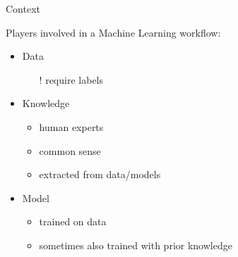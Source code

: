 \documentclass[presentation]{beamer}\mode<presentation>{\usetheme{blackAMSBolognaFC}}
\begin{document}
\begin{frame}[c]{Context}

    Players involved in a Machine Learning workflow:
    \vspace{0.5cm}
    \begin{itemize}
        \item Data
        \begin{itemize}
            \item[!] require \alert{labels}
        \end{itemize}

        \vfill

        \item Knowledge
        \begin{itemize}
            \item human experts
            \item common sense
            \item extracted from data/models
        \end{itemize}

        \vfill

        \item Model
        \begin{itemize}
            \item trained on data
            \item sometimes also trained with prior knowledge
        \end{itemize}

    \end{itemize}
\end{frame}
\end{document}
